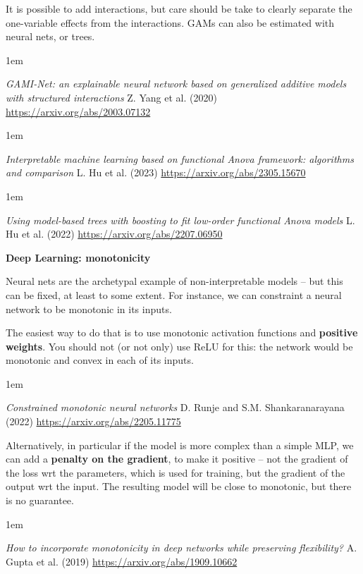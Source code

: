 \documentclass[a5paper]{article}
\let\d\textbf
\newenvironment{reference}{%
  \medskip\goodbreak
  \parskip 0pt
  \raggedright
  \leftskip 1em
  \obeylines
}{\par\medskip\goodbreak}
\def\subsection#1{{\par\bigskip\goodbreak\large\bfseries #1\par}}
\begin{document}
It is possible to add interactions, but care should be take to clearly separate
the one-variable effects from the interactions.
GAMs can also be estimated with neural nets, or trees.

\begin{reference}
  \emph{GAMI-Net: an explainable neural network based on generalized additive models with structured interactions}
  Z. Yang et al. (2020)
  \url{https://arxiv.org/abs/2003.07132}
\end{reference}

\begin{reference}
  \emph{Interpretable machine learning based on functional Anova framework: algorithms and comparison}
  L. Hu et al. (2023)
  \url{https://arxiv.org/abs/2305.15670}
\end{reference}

\begin{reference}
  \emph{Using model-based trees with boosting to fit low-order functional Anova models}
  L. Hu et al. (2022)
  \url{https://arxiv.org/abs/2207.06950}
\end{reference}

\subsection{Deep Learning: monotonicity}
  
Neural nets are the archetypal example of non-interpretable models --
but this can be fixed, at least to some extent.
For instance, we can constraint a neural network to be monotonic in its inputs.

The easiest way to do that is to use monotonic activation functions and \d{positive weights}.
You should not (or not only) use ReLU for this: the network would be monotonic and convex
in each of its inputs.

\begin{reference}
  \emph{Constrained monotonic neural networks}
  D. Runje and S.M. Shankaranarayana (2022)
  \url{https://arxiv.org/abs/2205.11775}
\end{reference}

Alternatively, in particular if the model is more complex than a simple MLP,
we can add a \d{penalty on the gradient}, to make it positive --
not the gradient of the loss wrt the parameters,
which is used for training, but the gradient of the output wrt the input.
The resulting model will be close to monotonic, but there is no guarantee.

\begin{reference}
  \emph{How to incorporate monotonicity in deep networks while preserving flexibility?}
  A. Gupta et al. (2019)
  \url{https://arxiv.org/abs/1909.10662}
\end{reference}
\end{document}
